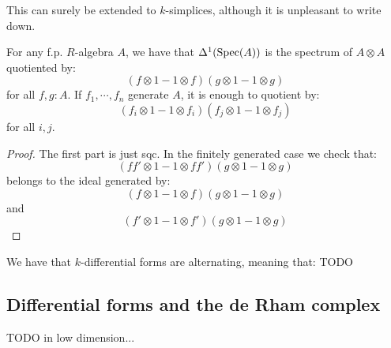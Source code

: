 This can surely be extended to $k$-simplices, although it is unpleasant to write down.

\begin{corollary}
For any f.p. $R$-algebra $A$, we have that $\Delta^1(\operatorname{Spec}(A))$ is the spectrum of $A\otimes A$ quotiented by:
\[(f\otimes 1 - 1\otimes f)(g\otimes 1 - 1\otimes g)\]
for all $f,g:A$. If $f_1,\cdots,f_n$ generate $A$, it is enough to quotient by:
\[(f_i\otimes 1 - 1\otimes f_i)(f_j\otimes 1 - 1\otimes f_j)\]
for all $i,j$.
\end{corollary}

\begin{proof}
The first part is just sqc. In the finitely generated case we check that:
\[(ff'\otimes 1 - 1\otimes ff')(g\otimes 1 - 1\otimes g)\]
belongs to the ideal generated by:
\[(f\otimes 1 - 1\otimes f)(g\otimes 1 - 1\otimes g)\]
and
\[(f'\otimes 1 - 1\otimes f')(g\otimes 1 - 1\otimes g)\]
\end{proof}

\begin{proposition}
We have that $k$-differential forms are alternating, meaning that: TODO
\end{proposition}

\subsection{Differential forms and the de Rham complex}

TODO in low dimension...

